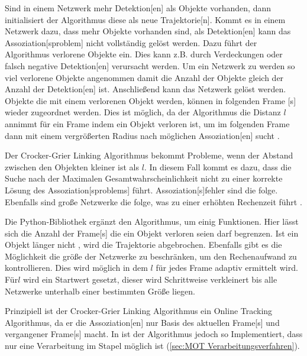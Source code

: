 Sind in einem Netzwerk mehr \gls{Detektion}[en] als Objekte vorhanden, dann initialisiert der Algorithmus diese als neue \gls{Trajektorie}[n]. Kommt es in einem Netzwerk dazu, dass mehr Objekte vorhanden sind, als \gls{Detektion}[en] kann das \gls{Assoziation}[sproblem] nicht vollständig gelöst werden. Dazu führt der Algorithmus verlorene Objekte ein. Dies kann z.B. durch Verdeckungen oder falsch negative \gls{Detektion}[en] verursacht werden. Um ein Netzwerk zu  werden so viel verlorene Objekte angenommen damit die Anzahl der Objekte gleich der Anzahl der \gls{Detektion}[en] ist. Anschließend kann das Netzwerk gelöst werden. Objekte die mit einem verlorenen Objekt  werden, können in folgenden \gls{Frame} [s] wieder zugeordnet werden. Dies ist möglich, da der Algorithmus die Distanz \(l\) annimmt für ein \gls{Frame} indem ein Objekt verloren ist, um im folgenden \gls{Frame} dann mit einem vergrößerten Radius nach möglichen \gls{Assoziation}[en] sucht \cite{Crocker.1996}. \par 

Der Crocker-Grier Linking Algorithmus bekommt Probleme, wenn der Abstand zwischen den Objekten kleiner ist als \(l\). In diesem Fall kommt es dazu, dass die Suche nach der Maximalen Gesamtwahrscheinlichkeit nicht zu einer korrekte Lösung des \gls{Assoziation}[sproblems] führt. \gls{Assoziation}[s]fehler sind die folge. Ebenfalls sind große Netzwerke die folge, was zu einer erhöhten Rechenzeit führt \cite{Crocker.1996}. \par

Die \gls{Python}-\gls{Bibliothek} \cite{Allan.2023} ergänzt den Algorithmus, um einig Funktionen. Hier lässt sich die Anzahl der \gls{Frame}[s] die ein Objekt verloren seien darf begrenzen. Ist ein Objekt länger nicht , wird die \gls{Trajektorie} abgebrochen. Ebenfalls gibt es die Möglichkeit die größe der Netzwerke zu beschränken, um den Rechenaufwand zu kontrollieren. Dies wird möglich in dem \(l\) für jedes \gls{Frame} adaptiv ermittelt wird. Für\(l\) wird ein Startwert gesetzt, dieser wird Schrittweise verkleinert bis alle Netzwerke unterhalb einer bestimmten Größe liegen. \par

Prinzipiell ist der Crocker-Grier Linking Algorithmus ein \gls{Online Tracking} Algorithmus, da er die \gls{Assoziation}[en] nur Basis des aktuellen \gls{Frame}[s] und vergangener \gls{Frame}[s] macht. In \cite{Allan.2023} ist der Algorithmus jedoch so Implementiert, dass nur eine Verarbeitung im Stapel möglich ist (\ref{sec:MOT Verarbeitungsverfahren}). 

